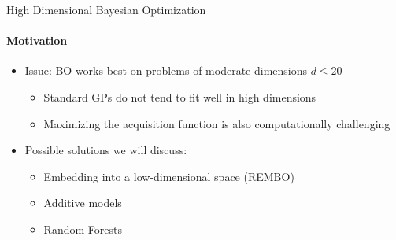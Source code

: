 \begin{frame}[c]{High Dimensional Bayesian Optimization}
\framesubtitle{Motivation}

\begin{itemize}
    \item Issue: BO works best on problems of moderate dimensions $d\leq20$
    \begin{itemize}
        \item Standard GPs do not tend to fit well in high dimensions
        \item Maximizing the acquisition function is also computationally challenging
    \end{itemize}
\medskip
\pause

    \item Possible solutions we will discuss:
    \begin{itemize}
        \item Embedding into a low-dimensional space (REMBO) 
        \item Additive models 
        \item Random Forests 
    \end{itemize}
\end{itemize}


\end{frame}


